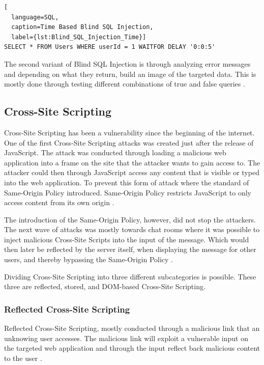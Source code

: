 \hfill
\begin{lstlisting}[
  language=SQL,
  caption=Time Based Blind SQL Injection,
  label={lst:Blind_SQL_Injection_Time}]
SELECT * FROM Users WHERE userId = 1 WAITFOR DELAY '0:0:5'
\end{lstlisting}
\hfill

The second variant of Blind SQL Injection is through analyzing error messages and depending on what they return, build an image of the targeted data. This is mostly done through testing different combinations of true and false queries \parencite{JustinClarke-Salt2009SIAa, Secure_Web}.



\subsection{Cross-Site Scripting}
Cross-Site Scripting has been a vulnerability since the beginning of the internet. One of the first Cross-Site Scripting attacks was created just after the release of JavaScript. The attack was conducted through loading a malicious web application into a frame on the site that the attacker wants to gain access to. The attacker could then through JavaScript access any content that is visible or typed into the web application. To prevent this form of attack where the standard of Same-Origin Policy introduced. Same-Origin Policy restricts JavaScript to only access content from its own origin \parencite{FogieSeth2007Xacs, w3csop}.

The introduction of the Same-Origin Policy, however, did not stop the attackers. The next wave of attacks was mostly towards chat rooms where it was possible to inject malicious Cross-Site Scripts into the input of the message. Which would then later be reflected by the server itself, when displaying the message for other users, and thereby bypassing the Same-Origin Policy \parencite{FogieSeth2007Xacs}.

Dividing Cross-Site Scripting into three different subcategories is possible. These three are reflected, stored, and DOM-based Cross-Site Scripting.



\subsubsection{Reflected Cross-Site Scripting}
Reflected Cross-Site Scripting, mostly conducted through a malicious link that an unknowing user accesses. The malicious link will exploit a vulnerable input on the targeted web application and through the input reflect back malicious content to the user \parencite{Secure_Web}.



